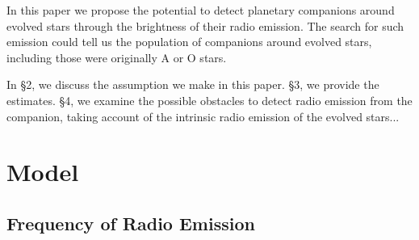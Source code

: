 \documentclass{emulateapj}
\def\memoYF#1{\color{red}$[${\bf #1}$]$ \color{black}}
\begin{document}
In this paper we propose the potential to detect planetary companions around evolved stars through the brightness of their radio emission. 
The search for such emission could tell us the population of companions around evolved stars, including those were originally A or O stars. 

In \S2, we discuss the assumption we make in this paper. 
\S3, we provide the estimates. 
\S4, we examine the possible obstacles to detect radio emission from the companion, taking account of the intrinsic radio emission of the evolved stars...






\section{Model}
\label{s:assumptions}

\subsection{Frequency of Radio Emission}

\end{document}
